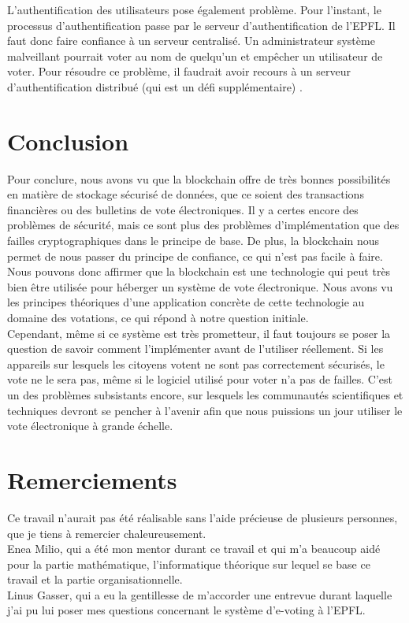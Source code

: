 \documentclass[10pt,a4paper,twoside]{article}
\numberwithin{equation}{section}
\begin{document}
		L'authentification des utilisateurs pose également problème. Pour l'instant, le processus d'authentification passe par le serveur d'authentification de l'EPFL. Il faut donc faire confiance à un serveur centralisé. Un administrateur système malveillant pourrait voter au nom de quelqu'un et empêcher un utilisateur de voter. Pour résoudre ce problème, il faudrait avoir recours à un serveur d'authentification distribué (qui est un défi supplémentaire) \cite{evoting_epfl} \cite{interview}.

\section{Conclusion}
	Pour conclure, nous avons vu que la blockchain offre de très bonnes possibilités en  matière de stockage sécurisé de données, que ce soient des transactions financières ou des bulletins de vote électroniques. Il y a certes encore des problèmes de sécurité, mais ce sont plus des problèmes d'implémentation que des failles cryptographiques dans le principe de base. De plus, la blockchain nous permet de nous passer du principe de confiance, ce qui n'est pas facile à faire. Nous pouvons donc affirmer que la blockchain est une technologie qui peut très bien être utilisée pour héberger un système de vote électronique. Nous avons vu les principes théoriques d'une application concrète de cette technologie au domaine des votations, ce qui répond à notre question initiale.\\
	
	Cependant, même si ce système est très prometteur, il faut toujours se poser la question de savoir comment l'implémenter avant de l'utiliser réellement. Si les appareils sur lesquels les citoyens votent ne sont pas correctement sécurisés, le vote ne le sera pas, même si le logiciel utilisé pour voter n'a pas de failles. C'est un des problèmes subsistants encore, sur lesquels les communautés scientifiques et techniques devront se pencher à l'avenir afin que nous puissions un jour utiliser le vote électronique à grande échelle.
	
\section*{Remerciements}
	Ce travail n'aurait pas été réalisable sans l'aide précieuse de plusieurs personnes, que je tiens à remercier chaleureusement. \\
	 Enea Milio, qui a été mon mentor durant ce travail et qui m'a beaucoup aidé pour la partie mathématique, l'informatique théorique sur lequel se base ce travail et la partie organisationnelle.\\
	 Linus Gasser, qui a eu la gentillesse de m'accorder une entrevue durant laquelle j'ai pu lui poser mes questions concernant le système d'e-voting à l'EPFL.




\listoffigures
\listoftables

	
\end{document}

